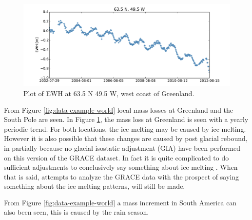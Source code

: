 \begin{figure}[H]
	\centering
	\includegraphics[width=\textwidth]{figures/data-example-scatter}
	\caption{Plot of EWH at 63.5 N 49.5 W, west coast of Greenland.}
	\label{fig:data-example-scatter}
\end{figure}

From Figure \ref{fig:data-example-world} local mass losses at Greenland and the South Pole are seen.
In Figure \ref{fig:data-example-scatter}, the mass loss at Greenland is seen with a yearly periodic trend. For both locations, the ice melting may be caused by ice melting.
However it is also possible that these changes are caused by post glacial rebound, in partially because no glacial isostatic adjustment (GIA) have been performed on this version of the GRACE dataset.
In fact it is quite complicated to do sufficient adjustments to conclusively say something about ice melting \cite{NASA-GIA-incomplete}.
When that is said, attempts to analyze the GRACE data with the prospect of saying something about the ice melting patterns, will still be made.

From Figure \ref{fig:data-example-world} a mass increment in South America can also been seen, this is caused by the rain season.
